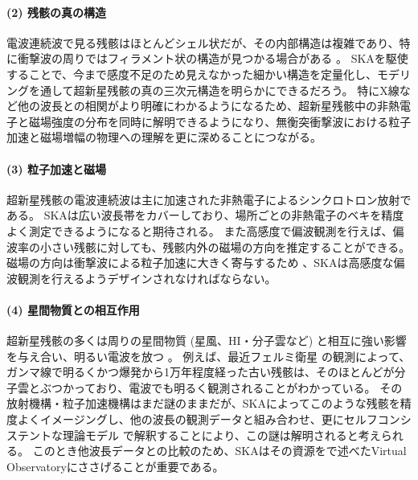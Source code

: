 \paragraph{(2) 残骸の真の構造}
電波連続波で見る残骸はほとんどシェル状だが、その内部構造は複雑であり、特に衝撃波の周りではフィラメント状の構造が見つかる場合がある \citep[][]{1997ApJ...491..816R,2007A&A...471..537C,Reynolds2011}。
SKAを駆使することで、今まで感度不足のため見えなかった細かい構造を定量化し、モデリングを通して超新星残骸の真の三次元構造を明らかにできるだろう。
特にX線など他の波長との相関がより明確にわかるようになるため、超新星残骸中の非熱電子と磁場強度の分布を同時に解明できるようになり、無衡突衝撃波における粒子加速と磁場増幅の物理への理解を更に深めることにつながる。

\paragraph{(3) 粒子加速と磁場}
超新星残骸の電波連続波は主に加速された非熱電子によるシンクロトロン放射である。
SKAは広い波長帯をカバーしており、場所ごとの非熱電子のベキを精度よく測定できるようになると期待される。
また高感度で偏波観測を行えば、偏波率の小さい残骸に対しても、残骸内外の磁場の方向を推定することができる。
磁場の方向は衝撃波による粒子加速に大きく寄与するため \citep[][]{1996ApJ...473.1029E,2013AJ....145..104R,2014ApJ...783...91C}、SKAは高感度な偏波観測を行えるようデザインされなければならない。

\paragraph{(4) 星間物質との相互作用}
超新星残骸の多くは周りの星間物質 (星風、HI・分子雲など) と相互に強い影響を与え合い、明るい電波を放つ \citep{2000ApJ...538..203B,2012ApJ...746...82F}。
例えば、最近フェルミ衛星 \citep[e.g.,][]{2013Sci...339..807A} の観測によって、ガンマ線で明るくかつ爆発から1万年程度経った古い残骸は、そのほとんどが分子雲とぶつかっており、電波でも明るく観測されることがわかっている。
その放射機構・粒子加速機構はまだ謎のままだが、SKAによってこのような残骸を精度よくイメージングし、他の波長の観測データと組み合わせ、更にセルフコンシステントな理論モデル \cite[e.g.,][]{0004-637X-750-2-156} で解釈することにより、この謎は解明されると考えられる。
このとき他波長データとの比較のため、SKAはその資源をで述べたVirtual Observatoryにささげることが重要である。


